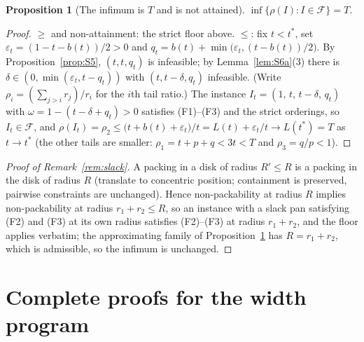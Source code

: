 \documentclass[11pt]{article}
\newtheorem{proposition}[theorem]{Proposition}
\theoremstyle{definition}
\begin{document}
\begin{proposition}[The infimum is $T$ and is not attained]\label{prop:S6}
$\inf\{\rho(I):I\in\mathcal F\}=T$.
\end{proposition}
\begin{proof}
$\ge$ and non-attainment: the strict floor above. $\le$: fix $t<t^{*}$, set
$\varepsilon_t=(1-t-b(t))/2>0$ and
$q_t=b(t)+\min\bigl(\varepsilon_t,(t-b(t))/2\bigr)$. By
Proposition~\ref{prop:S5}, $(t,t,q_t)$ is infeasible; by
Lemma~\ref{lem:S6a}(3) there is $\delta\in(0,\min(\varepsilon_t,t-q_t))$
with $(t,t-\delta,q_t)$ infeasible. (Write
$\rho_i=(\sum_{j>i}r_j)/r_i$ for the $i$th tail ratio.) The instance
$I_t=(1,\,t,\,t-\delta,\,q_t)$ with $\omega=1-(t-\delta+q_t)>0$ satisfies
(F1)--(F3) and the strict orderings, so $I_t\in\mathcal F$, and
$\rho(I_t)=\rho_2\le\bigl(t+b(t)+\varepsilon_t\bigr)/t
=L(t)+\varepsilon_t/t\longrightarrow L(t^{*})=T$ as $t\to t^{*}$
(the other tails are smaller: $\rho_1=t+p+q<3t<T$ and $\rho_3=q/p<1$).
\end{proof}

\begin{proof}[Proof of Remark~\ref{rem:slack}]
A packing in a disk of radius $R'\le R$ is a packing in the disk of radius
$R$ (translate to concentric position; containment is preserved, pairwise
constraints are unchanged). Hence non-packability at radius $R$ implies
non-packability at radius $r_1+r_2\le R$, so an instance with a slack pan
satisfying (F2) and (F3) at its own radius satisfies (F2)--(F3) at radius
$r_1+r_2$, and the floor applies verbatim; the approximating family of
Proposition~\ref{prop:S6} has $R=r_1+r_2$, which is admissible, so the
infimum is unchanged.
\end{proof}

\section{Complete proofs for the width program}\label{app:widthproofs}
\end{document}
